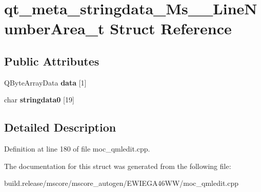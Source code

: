 \hypertarget{structqt__meta__stringdata___ms_____line_number_area__t}{}\section{qt\+\_\+meta\+\_\+stringdata\+\_\+\+Ms\+\_\+\+\_\+\+Line\+Number\+Area\+\_\+t Struct Reference}
\label{structqt__meta__stringdata___ms_____line_number_area__t}
\subsection*{Public Attributes}
\begin{DoxyCompactItemize}
\item 
\mbox{\label{structqt__meta__stringdata___ms_____line_number_area__t_ace70cd9bbf32cb78e2a6b0a80c0bd64c}} 
Q\+Byte\+Array\+Data {\bfseries data} \mbox{[}1\mbox{]}
\item 
\mbox{\label{structqt__meta__stringdata___ms_____line_number_area__t_aea972e7579e616df7ed314c8caff6a54}} 
char {\bfseries stringdata0} \mbox{[}19\mbox{]}
\end{DoxyCompactItemize}


\subsection{Detailed Description}


Definition at line 180 of file moc\+\_\+qmledit.\+cpp.



The documentation for this struct was generated from the following file\+:\begin{DoxyCompactItemize}
\item 
build.\+release/mscore/mscore\+\_\+autogen/\+E\+W\+I\+E\+G\+A46\+W\+W/moc\+\_\+qmledit.\+cpp\end{DoxyCompactItemize}
